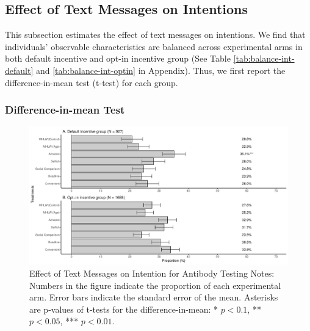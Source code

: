 \documentclass[
]{article}
\begin{document}
\hypertarget{intention}{%
\subsection{Effect of Text Messages on Intentions}\label{intention}}

This subsection estimates the effect of text messages on intentions. We find that individuals' observable characteristics are balanced across experimental arms in both default incentive and opt-in incentive group (See Table \ref{tab:balance-int-default} and \ref{tab:balance-int-optin} in Appendix). Thus, we first report the difference-in-mean test (t-test) for each group.

\hypertarget{difference-in-mean-test}{%
\subsubsection{Difference-in-mean Test}\label{difference-in-mean-test}}

\begin{figure}
\centering
\includegraphics{discussion-paper_files/figure-latex/ttest-int-test-1.pdf}
\caption{\label{fig:ttest-int-test}Effect of Text Messages on Intention for Antibody Testing Notes: Numbers in the figure indicate the proportion of each experimental arm. Error bars indicate the standard error of the mean. Asterisks are p-values of t-tests for the difference-in-mean: * \(p < 0.1\), ** \(p < 0.05\), *** \(p < 0.01\).}
\end{figure}
\end{document}

